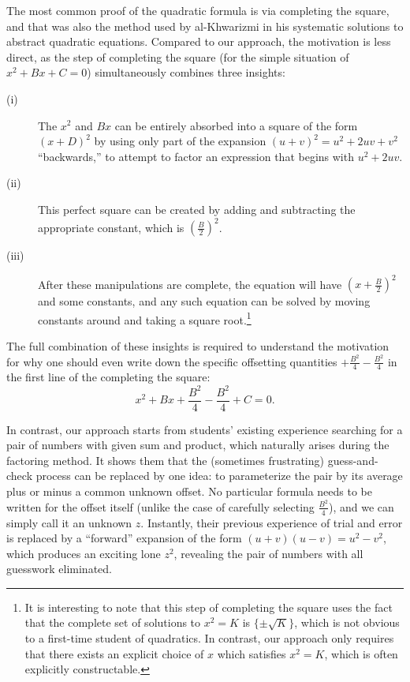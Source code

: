 The most common proof of the quadratic formula is via completing the square, and
that was also the method used by al-Khwarizmi \cite{al-khwarizmi} in his
systematic solutions to abstract quadratic equations. Compared to our approach,
the motivation is less direct, as the step of completing the square (for the
simple situation of $x^2 + Bx + C = 0$) simultaneously combines three insights:
\begin{description}
  \item[(i)] The $x^2$ and $Bx$ can be entirely absorbed into a square of
    the form $(x + D)^2$ by using only part of the expansion $(u+v)^2 = u^2
    + 2uv + v^2$ ``backwards,'' to attempt to factor an expression that
    begins with $u^2 + 2uv$.
  \item[(ii)] This perfect square can be created by adding and subtracting the
    appropriate constant, which is $(\frac{B}{2})^2$.
  \item[(iii)] After these manipulations are complete, the equation will have
    $(x + \frac{B}{2})^2$ and some constants, and any such equation can be
    solved by moving constants around and taking a square
    root.\footnote{\label{ftCompSqr} It is interesting to note that this step of
    completing the square uses the fact that the complete set of solutions to
    $x^2 = K$ is $\{\pm \sqrt{K}\}$, which is not obvious to a first-time
  student of quadratics. In contrast, our approach only requires that there
exists an explicit choice of $x$ which satisfies $x^2 = K$, which is often
explicitly constructable.}
\end{description}
The full combination of these insights is required to understand the motivation
for why one should even write down the specific offsetting quantities
$+\frac{B^2}{4} - \frac{B^2}{4}$ in the first line of the completing the square:
\begin{displaymath}
  x^2 + Bx + \frac{B^2}{4} - \frac{B^2}{4} + C = 0.
\end{displaymath}

In contrast, our approach starts from students' existing experience searching
for a pair of numbers with given sum and product, which naturally arises during
the factoring method.  It shows them that the (sometimes frustrating)
guess-and-check process can be replaced by one idea: to parameterize the pair by
its average plus or minus a common unknown offset. No particular formula needs
to be written for the offset itself (unlike the case of carefully selecting
$\frac{B^2}{4}$), and we can simply call it an unknown $z$. Instantly, their
previous experience of trial and error is replaced by a ``forward'' expansion of
the form $(u+v)(u-v) = u^2 - v^2$, which produces an exciting lone $z^2$,
revealing the pair of numbers with all guesswork eliminated.


